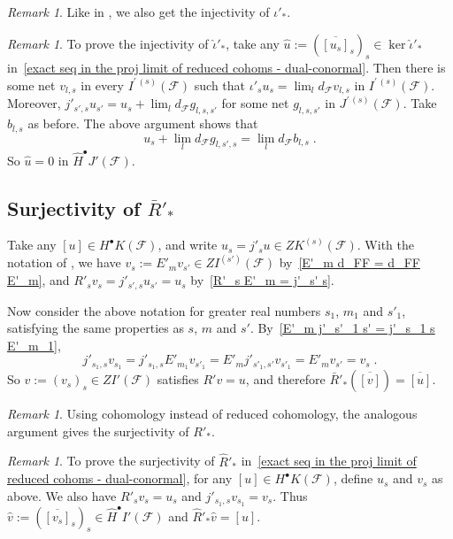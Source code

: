 \documentclass{memo-l}
\theoremstyle{plain}
\theoremstyle{definition}
\theoremstyle{remark}
\newtheorem{rem}[thm]{Remark}
\newcommand{\FF}{\mathcal{F}}
\numberwithin{section}{chapter}
\numberwithin{equation}{section}%
\begin{document}
\begin{rem}\label{r: ker iota'_* = 0}
Like in , we also get the injectivity of $\iota'_*$.
\end{rem}

\begin{rem}\label{r: ker hat iota'_* = 0}
To prove the injectivity of $\hat\iota'_*$, take any $\hat u:=(\overline{[u_s]}_s)_s\in\ker\hat\iota'_*$ in~\eqref{exact seq in the proj limit of reduced cohoms - dual-conormal}. Then there is some net $v_{l,s}$ in every $I^{\prime\,(s)}(\FF)$ such that $\iota'_su_s=\lim_ld_\FF v_{l,s}$ in $I^{\prime\,(s)}(\FF)$. Moreover, $j'_{s',s}u_{s'}=u_s+\lim_ld_\FF g_{l,s,s'}$ for some net $g_{l,s,s'}$ in $J^{\prime\,(s)}(\FF)$. Take $b_{l,s}$ as before. The above argument shows that 
\[
u_s+\lim_ld_\FF g_{l,s',s}=\lim_ld_\FF b_{l,s}\;.
\]
So $\hat u=0$ in $\widehat H^\bullet J'(\FF)$.
\end{rem}


\subsection{Surjectivity of $\bar R'_*$}\label{ss: surjectivity of bar R'_*}

Take any $[u]\in H^\bullet K(\FF)$, and write $u_s=j'_su\in ZK^{(s)}(\FF)$. With the notation of , we have $v_s:=E'_mv_{s'}\in ZI^{(s')}(\FF)$ by~\eqref{E'_m d_FF = d_FF E'_m}, and $R'_sv_s=j'_{s',s}u_{s'}=u_s$ by~\eqref{R'_s E'_m = j'_s' s}.

Now consider the above notation for greater real numbers $s_1$, $m_1$ and $s'_1$, satisfying the same properties as $s$, $m$ and $s'$. By~\eqref{E'_m j'_s'_1 s' = j'_s_1 s E'_m_1},
\[
j'_{s_1,s}v_{s_1}=j'_{s_1,s}E'_{m_1}v_{s'_1}=E'_mj'_{s'_1,s'}v_{s'_1}=E'_mv_{s'}=v_s\;.
\]
So $v:=(v_s)_s\in ZI'(\FF)$ satisfies $R'v=u$, and therefore $\bar R'_*(\overline{[v]})=\overline{[u]}$.

\begin{rem}\label{r: surjectivity of R'_*}
Using cohomology instead of reduced cohomology, the analogous argument gives the surjectivity of $R'_*$.
\end{rem}

\begin{rem}\label{r: surjectivity of widehat R'_*}
To prove the surjectivity of $\widehat R'_*$ in~\eqref{exact seq in the proj limit of reduced cohoms - dual-conormal}, for any $[u]\in H^\bullet K(\FF)$, define $u_s$ and $v_s$ as above. We also have $R'_sv_s=u_s$ and $j'_{s_1,s}v_{s_1}=v_s$. Thus $\hat v:=(\overline{[v_s]}_s)_s\in\widehat H^\bullet I'(\FF)$ and $\widehat R'_*\hat v=[u]$.
\end{rem}
\end{document}

